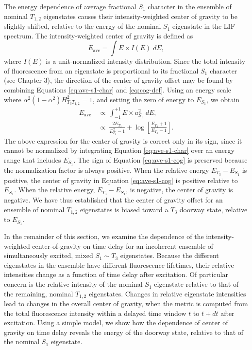 \documentclass[12pt]{mitthesis}
\begin{document}
The energy dependence of average fractional $S_1$ character in the
ensemble of nominal $T_{1,2}$ eigenstates causes their
intensity-weighted center of gravity to be slightly shifted, relative
to the energy of the nominal $S_1$ eigenstate in the LIF spectrum.
The intensity-weighted center of gravity is defined as
\begin{equation}
  \label{eq:cog-def}
  E_{\text{ave}} = \int E \times I(E) \; dE,
\end{equation}
where $I(E)$ is a unit-normalized intensity distribution.  Since the
total intensity of fluorescence from an eigenstate is proportional to
its fractional $S_1$ character (see Chapter 3), the direction of the
center of gravity offset may be found by combining Equations
\ref{eq:ave-s1-char} and \ref{eq:cog-def}.  Using an energy scale
where $\alpha^2 (1-\alpha^2) H_{T_3T_{1,2}}^2 = 1$, and setting the
zero of energy to $E_{S_1}$, we obtain
\begin{equation}
  \label{eq:ave-s1-cog}
  \begin{split}
    E_{\text{ave}} \: 
    &\propto \: \int_{-1}^{+1} E \times a_{S_1}^2 \; dE,\\
    &\propto \: \frac{2 E_{T_3}}{E_{T_3}^2 - 1} + \log
    \left[
      \frac{E_{T_3}+1}{E_{T_3}-1}
    \right].
  \end{split}
\end{equation}
The above expression for the center of gravity is correct only in its
sign, since it cannot be normalized by integrating Equation
\ref{eq:ave-s1-char} over an energy range that includes $E_{S_1}$.
The sign of Equation \ref{eq:ave-s1-cog} is preserved because the
normalization factor is always positive.  When the relative energy
$E_{T_3} - E_{S_1}$ is positive, the center of gravity in Equation
\ref{eq:ave-s1-cog} is positive relative to $E_{S_1}$.  When the
relative energy, $E_{T_3} - E_{S_1}$, is negative, the center of
gravity is negative.  We have thus established that the center of
gravity offset for an ensemble of nominal $T_{1,2}$ eigenstates is
biased toward a $T_3$ doorway state, relative to $E_{S_1}$.

In the remainder of this section, we examine the dependence of the
intensity-weighted center-of-gravity on time delay for an incoherent
ensemble of simultaneously excited, mixed $S_1 \sim T_3$ eigenstates.
Because the different eigenstates in the ensemble have different
fluorescence lifetimes, their relative intensities change as a
function of time delay after excitation.  Of particular concern is the
relative intensity of the nominal $S_1$ eigenstate relative to that of
the remaining, nominal $T_{1,2}$ eigenstates.  Changes in relative
eigenstate intensities lead to changes in the overall center of
gravity, when the metric is computed from the total fluorescence
intensity within a delayed time window $t$ to $t+dt$ after excitation.
Using a simple model, we show how the dependence of center of gravity
on time delay reveals the energy of the doorway state, relative to
that of the nominal $S_1$ eigenstate.
\end{document}
